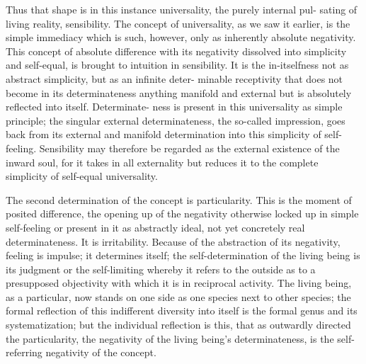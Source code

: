 Thus that shape is in this instance universality, the purely internal pul-
sating of living reality, sensibility. The concept of universality, as we saw it
earlier, is the simple immediacy which is such, however, only as inherently
absolute negativity. This concept of absolute difference with its negativity
dissolved into simplicity and self-equal, is brought to intuition in sensibility.
It is the in-itselfness not as abstract simplicity, but as an infinite deter-
minable receptivity that does not become in its determinateness anything
manifold and external but is absolutely reflected into itself. Determinate-
ness is present in this universality as simple principle; the singular external
determinateness, the so-called impression, goes back from its external and
manifold determination into this simplicity of self-feeling. Sensibility may
therefore be regarded as the external existence of the inward soul, for it
takes in all externality but reduces it to the complete simplicity of self-equal
universality.

The second determination of the concept is particularity. This is the
moment of posited difference, the opening up of the negativity otherwise
locked up in simple self-feeling or present in it as abstractly ideal, not yet
concretely real determinateness. It is irritability. Because of the abstraction
of its negativity, feeling is impulse; it determines itself; the self-determination
of the living being is its judgment or the self-limiting whereby it refers to
the outside as to a presupposed objectivity with which it is in reciprocal
activity.
 The living being, as a particular, now stands on one side as one
species next to other species; the formal reflection of this indifferent diversity
into itself is the formal genus and its systematization; but the individual
reflection is this, that as outwardly directed the particularity, the negativity
of the living being's determinateness, is the self-referring negativity of the
concept.

